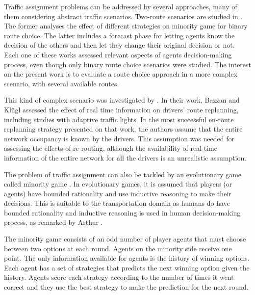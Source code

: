 \documentclass{RITA}
\begin{document}
Traffic assignment problems can be addressed by several approaches, many of them considering abstract traffic scenarios. Two-route scenarios are studied in \cite{Bazzan+2000icmas,Kluegl&Bazzan2004}. The former analyses the effect of different strategies on minority game for binary route choice. The latter includes a forecast phase for letting agents know the decision of the others and then let they change their original decision or not. Each one of these works assessed relevant aspects of agents decision-making process, even though only binary route choice scenarios were studied. The interest on the present work is to evaluate a route choice approach in a more complex scenario, with several available routes.

This kind of complex scenario was investigated by \cite{Bazzan&Kluegl2008}. In their work, Bazzan and Kl\"ugl assessed the effect of real time information on drivers' route replanning, including studies with adaptive traffic lights. In the most successful en-route replanning strategy presented on that work, the authors assume that the entire network occupancy is known by the drivers. This assumption was needed for assessing the effects of re-routing, although the availability of real time information of the entire network for all the drivers is an unrealistic assumption.

The problem of traffic assignment can also be tackled by an evolutionary game called minority game \cite{Challet&Zhang1997}. In evolutionary games, it is assumed that players (or agents) have bounded rationality and use inductive reasoning to make their decisions. This is suitable to the transportation domain as humans do have bounded rationality and inductive reasoning is used in human decision-making process, as remarked by Arthur \cite{Arthur1994}.

The minority game consists of an odd number of player agents that must choose between two options at each round. Agents on the minority side receive one point. The only information available for agents is the history of winning options. Each agent has a set of strategies that predicts the next winning option given the history. Agents score each strategy according to the number of times it went correct and they use the best strategy to make the prediction for the next round.
\end{document}
